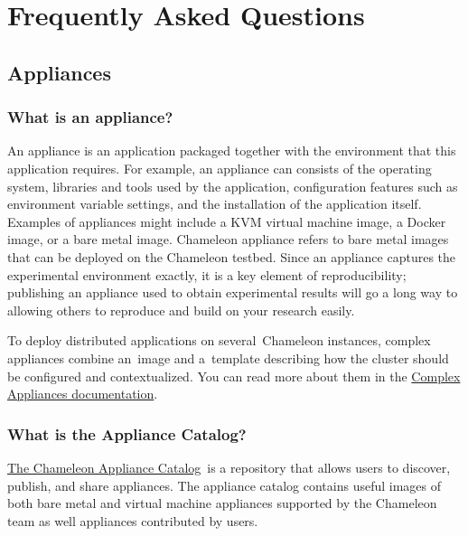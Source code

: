 

\chapter{Frequently Asked Questions}\label{frequently-asked-questions}

\FILENAME

\section{Appliances}\label{appliances}

\subsection{What is an appliance?}\label{what-is-an-appliance}

An appliance is an application packaged together with the environment
that this application requires. For example, an appliance can consists
of the operating system, libraries and tools used by the application,
configuration features such as environment variable settings, and the
installation of the application itself. Examples of appliances might
include a KVM virtual machine image, a Docker image, or a bare metal
image. Chameleon appliance refers to bare metal images that can be
deployed on the Chameleon testbed. Since an appliance captures the
experimental environment exactly, it is a key element of
reproducibility; publishing an appliance used to obtain experimental
results will go a long way to allowing others to reproduce and build on
your research easily.

To deploy distributed applications on several~Chameleon instances,
complex appliances combine an~image and a~template describing how the
cluster should be configured and contextualized. You can read more about
them in the
\href{https://www.chameleoncloud.org/docs/complex-appliances/}{Complex
Appliances documentation}.

\subsection{What is the Appliance Catalog?}\label{what-is-the-chameleon-appliance-catalog}

\href{https://www.chameleoncloud.org/appliances/}{The Chameleon
Appliance Catalog}~is a repository that allows users to discover,
publish, and share appliances. The appliance catalog contains useful
images of both bare metal and virtual machine appliances supported by
the Chameleon team as well appliances contributed by users.

